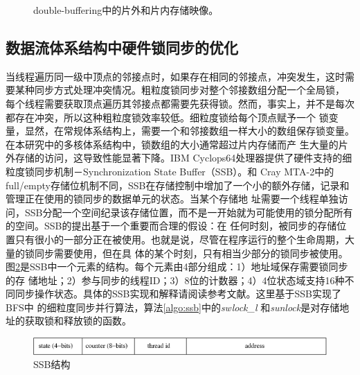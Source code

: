 \begin{flushleft}
\begin{figure}[!htbp]
\begin{center}
		\caption{double-buffering中的片外和片内存储映像。}
		\label{fig:db}
	\end{center}
\end{figure}


\subsection{数据流体系结构中硬件锁同步的优化}
当线程遍历同一级中顶点的邻接点时，如果存在相同的邻接点，冲突发生，这时需要某种同步方式处理冲突情况。粗粒度锁同步对整个邻接数组分配一个全局锁，
每个线程需要获取顶点遍历其邻接点都需要先获得锁。然而，事实上，并不是每次都存在冲突，所以这种粗粒度锁效率较低。细粒度锁给每个顶点赋予一个
锁变量，显然，在常规体系结构上，需要一个和邻接数组一样大小的数组保存锁变量。在本研究中的多核体系结构中，锁数组的大小通常超过片内存储而产
生大量的片外存储的访问，这导致性能显著下降。IBM Cyclops64处理器提供了硬件支持的细粒度锁同步机制－Synchronization State Buffer（SSB）\citep{ssb-isca07}。和
Cray MTA-2中的full/empty存储位机制不同，SSB在存储控制中增加了一个小的额外存储，记录和管理正在使用的锁同步的数据单元的状态。当某个存储地
址需要一个线程单独访问，SSB分配一个空间纪录该存储位置，而不是一开始就为可能使用的锁分配所有的空间。SSB的提出基于一个重要而合理的假设：在
任何时刻，被同步的存储位置只有很小的一部分正在被使用。也就是说，尽管在程序运行的整个生命周期，大量的锁同步需要使用，但在具
体的某个时刻，只有相当少部分的锁同步被使用。图\ref{fig:ssb-entry}是SSB中一个元素的结构。每个元素由4部分组成：1）地址域保存需要锁同步的存
储地址；2）参与同步的线程ID；3）8位的计数器；4）4位状态域支持16种不同同步操作状态。具体的SSB实现和解释请阅读参考文献。这里基于SSB实现了BFS中
的细粒度同步并行算法，算法\ref{algo:ssb}中的{\it swlock\_l} 和{\it sunlock}是对存储地址的获取锁和释放锁的函数。
\begin{figure}[!htbp]
	\begin{center}
		\includegraphics[scale=0.6]{Img/Chap_Algorithm/entry}
		\caption{SSB结构} \label{fig:ssb-entry}
	\end{center}
\end{figure}


\end{flushleft}
